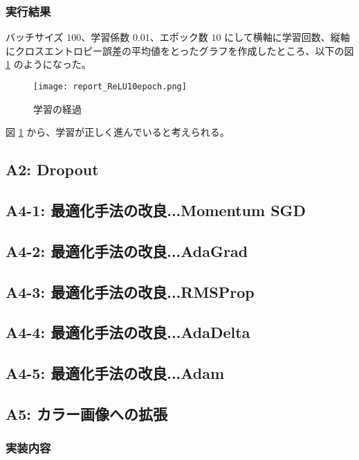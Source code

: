 \documentclass[a4paper,dvipdfmx]{jsarticle}
\begin{document}
\subsubsection*{実行結果}

バッチサイズ $100$、学習係数 $0.01$、エポック数 $10$ にして横軸に学習回数、縦軸にクロスエントロピー誤差の平均値をとったグラフを作成したところ、以下の図 \ref{fig-A-1-1} のようになった。

\begin{figure}[H]
\centering
\texttt{[image: report\_ReLU10epoch.png]}
\caption{学習の経過}
\label{fig-A-1-1}
\end{figure}

図 \ref{fig-A-1-1} から、学習が正しく進んでいると考えられる。

\subsection*{A2: Dropout}

\subsection*{A4-1: 最適化手法の改良...Momentum SGD}


\subsection*{A4-2: 最適化手法の改良...AdaGrad}

\subsection*{A4-3: 最適化手法の改良...RMSProp}

\subsection*{A4-4: 最適化手法の改良...AdaDelta}

\subsection*{A4-5: 最適化手法の改良...Adam}

\subsection*{A5: カラー画像への拡張}

\subsubsection*{実装内容}
\end{document}
